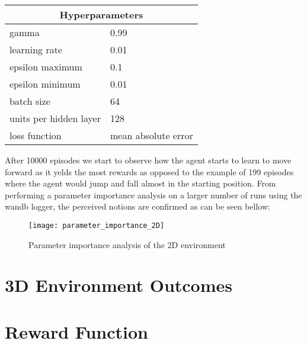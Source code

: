 \begin{table}[H]
    \centering
    \begin{tabular}{|ll|}
    \hline
    \multicolumn{2}{|c|}{Hyperparameters}                              \\ \hline
    \multicolumn{1}{|l|}{gamma}                  & 0.99                \\ \hline
    \multicolumn{1}{|l|}{learning rate}          & 0.01                \\ \hline
    \multicolumn{1}{|l|}{epsilon maximum}        & 0.1                 \\ \hline
    \multicolumn{1}{|l|}{epsilon minimum}        & 0.01                \\ \hline
    \multicolumn{1}{|l|}{batch size}             & 64                  \\ \hline
    \multicolumn{1}{|l|}{units per hidden layer} & 128                 \\ \hline
    \multicolumn{1}{|l|}{loss function}          & mean absolute error \\ \hline
    \end{tabular}
\end{table}
After 10000 episodes we start to observe how the agent starts to learn to move forward as it yelds the most rewards as opposed to the example of 199 episodes where the agent would jump and fall almost in the starting position.
From performing a parameter importance analysis on a larger number of runs using the wandb logger, the perceived notions are confirmed as can be seen bellow:
\begin{figure}[H]
    \centering
    \texttt{[image: parameter\_importance\_2D]}
    \caption{Parameter importance analysis of the 2D environment}
\end{figure}

\section{3D Environment Outcomes}

\section{Reward Function}

